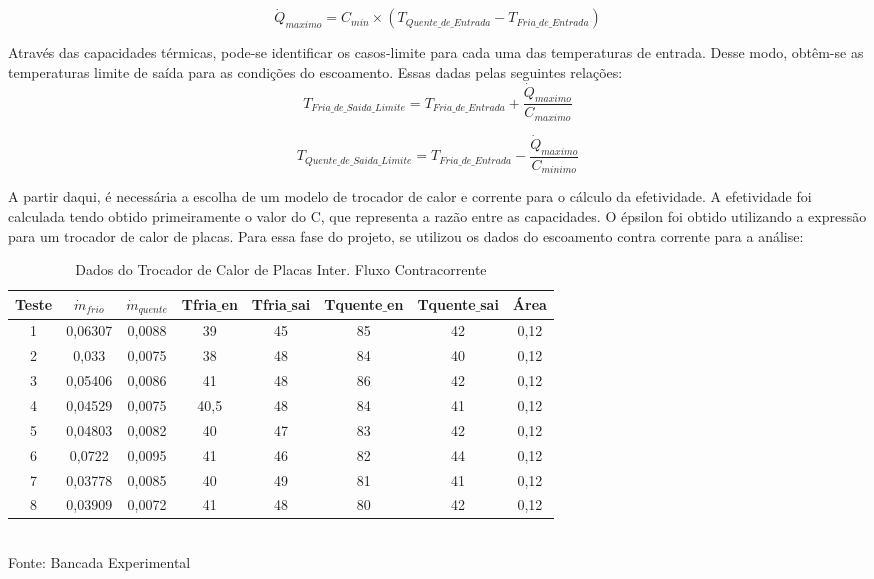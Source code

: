 \documentclass[a4paper,12pt,oneside]{article}
\begin{document}
\begin{flushright}
\begin{equation}\label{eq44}
\dot{Q}_{maximo} = C_{min} \times (T_{Quente\_de\_Entrada} - T_{Fria\_de\_Entrada})
\end{equation}
\vspace{0.5cm}

Através das capacidades térmicas, pode-se identificar os casos-limite para cada uma das temperaturas de entrada. Desse modo, obtêm-se as temperaturas limite de saída para as condições do escoamento. Essas dadas pelas seguintes relações:\\

\begin{equation}\label{eq45}
	T_{Fria\_de\_Saida\_Limite}= T_{Fria\_de\_Entrada} + \frac{\dot{Q}_{maximo}}{C_{maximo}}
\end{equation}
\vspace{0.5cm}

\begin{equation}\label{eq46}
	T_{Quente\_de\_Saida\_Limite}= T_{Fria\_de\_Entrada} - \frac{\dot{Q}_{maximo}}{C_{minimo}}
\end{equation}
\vspace{0.5cm}

A partir daqui, é necessária a escolha de um modelo de trocador de calor e corrente para o cálculo da efetividade. A efetividade foi calculada tendo obtido primeiramente o valor do C, que representa a razão entre as capacidades. O épsilon foi obtido utilizando a expressão para um trocador de calor de placas. Para essa fase do projeto, se utilizou os dados do escoamento contra corrente para a análise:
\pagebreak
\clearpage
\newpage

\begin{table}[h]
	\caption{Dados do Trocador de Calor de Placas Inter. Fluxo Contracorrente}
	\vspace{0.8cm}
	\centering
	\begin{tabular}{| c | c | c | c | c | c | c | c |}
		\hline
		Teste & $\dot{m}_{frio}$ & $\dot{m}_{quente}$&Tfria$\_$en& Tfria$\_$sai& Tquente$\_$en& Tquente$\_$sai& Área\\
		\hline
		1 & 0,06307 & 0,0088  & 39& 45& 85& 42&0,12\\
		\hline
		2 & 0,033 & 0,0075  & 38& 48& 84& 40& 0,12\\
		\hline
		3 & 0,05406 & 0,0086 & 41& 48& 86& 42& 0,12\\
		\hline
		4 &0,04529 & 0,0075 & 40,5& 48& 84& 41& 0,12\\
		\hline
		5 & 0,04803 & 0,0082 & 40& 47& 83& 42& 0,12\\
		\hline
		6 & 0,0722 & 0,0095  & 41& 46& 82& 44& 0,12\\
		\hline
		7 & 0,03778& 0,0085  & 40& 49& 81& 41& 0,12\\
		\hline
		8 & 0,03909 & 0,0072  & 41& 48& 80& 42& 0,12\\
		\hline
	\end{tabular}\\
	\vspace{0.8cm}
	Fonte: Bancada Experimental
	\vspace{1cm}
\end{table}


\end{flushright}
\end{document}
